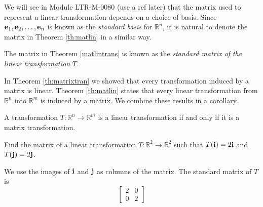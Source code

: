 \documentclass{ximera}
\renewcommand{\vec}[1]{{\bf #1}}
\newcommand{\RR}{\mathbb{R}}
\begin{document}
We will see in Module {\color{red}LTR-M-0080 (use a ref later)} that the matrix used to represent a linear transformation depends on a choice of basis.  Since $\vec{e}_1,\vec{e}_2,\dots,\vec{e}_n$ is known as the {\it standard basis} for $\RR^n$, it is natural to denote the matrix in Theorem \ref{th:matlin} in a similar way.


\begin{definition} 
  
The matrix in Theorem \ref{matlintrans} is known as the {\it standard matrix of the linear transformation} $T$.
  
\end{definition}


In Theorem \ref{th:matrixtran} we showed that every transformation induced by a matrix is linear.  Theorem \ref{th:matlin} states that every linear transformation from $\RR^n$ into $\RR^m$ is induced by a matrix.  We combine these results in a corollary.


  \begin{corollary}\label{cor} A transformation $T:\RR^n\rightarrow\RR^m$ is a linear transformation if and only if it is a matrix transformation.
\end{corollary}

\begin{example}\label{ex:findmatrix}
Find the matrix of a linear transformation $T:\RR^2\rightarrow \RR^2$ such that $T(\vec{i})=2\vec{i}$ and $T(\vec{j})=2\vec{j}$.  
\begin{explanation}
We use the images of $\vec{i}$ and $\vec{j}$ as columns of the matrix.  The standard matrix of $T$ is
$$\begin{bmatrix}2&0\\0&2\end{bmatrix}$$
\end{explanation}
\end{example}
 
 
 
\end{document}
